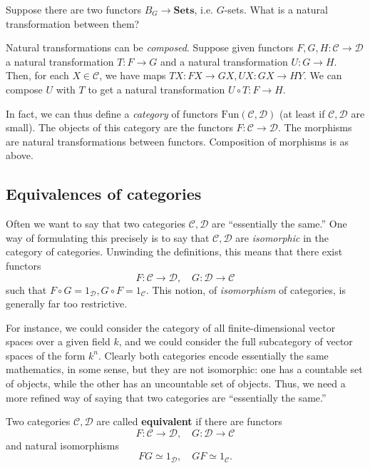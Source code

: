 \begin{exercise}
 Suppose there are  two functors $B_G \to
\mathbf{Sets}$, i.e. $G$-sets. What is a natural transformation between them?
\end{exercise}


Natural transformations can be \emph{composed}. Suppose given functors $F, G,
H: \mathcal{C} \to \mathcal{D}$ a natural
transformation $T: F \to G$ and a natural transformation $U: G \to H$. 
Then, for each $X \in \mathcal{C}$, we have maps $TX: FX \to GX, UX: GX \to
HY$. We can compose $U$ with $T$ to get a natural transformation $U \circ T: F
\to H$. 

In fact, we can thus define a \emph{category} of functors
$\mathrm{Fun}(\mathcal{C}, \mathcal{D})$ (at least if $\mathcal{C},
\mathcal{D}$ are small). The objects of this category are the functors $F:
\mathcal{C} \to \mathcal{D}$. The morphisms are natural transformations between
functors. Composition of morphisms is as above. 

\subsection{Equivalences of categories}

Often we want to say that two categories $\mathcal{C}, \mathcal{D}$ are ``essentially the same.'' One way
of formulating this precisely is to say that $\mathcal{C}, \mathcal{D}$ are
\emph{isomorphic} in the category of categories. Unwinding the definitions,
this means that there exist functors
\[ F: \mathcal{C} \to \mathcal{D}, \quad G: \mathcal{D} \to \mathcal{C} \]
such that $F \circ G = 1_{\mathcal{D}}, G \circ F = 1_{\mathcal{C}}$.
This notion, of \emph{isomorphism} of categories, is generally far too
restrictive.

For instance, we could consider the category of all finite-dimensional vector
spaces over a given field $k$, and we could consider the full subcategory
of vector spaces of the form $k^n$. Clearly both categories encode essentially
the same mathematics, in some sense, but they are not isomorphic: one has a
countable set of objects, while the other has an uncountable set of objects.
Thus, we need  a more refined way of saying that two categories are
``essentially the same.''

\begin{definition} 
Two categories $\mathcal{C}, \mathcal{D}$ are called \textbf{equivalent} if
there are functors
\[ F: \mathcal{C} \to \mathcal{D}, \quad G: \mathcal{D} \to \mathcal{C}  \]
and natural isomorphisms
\[ F G \simeq 1_{\mathcal{D}}, \quad GF \simeq 1_{\mathcal{C}}.  \]
\end{definition} 

